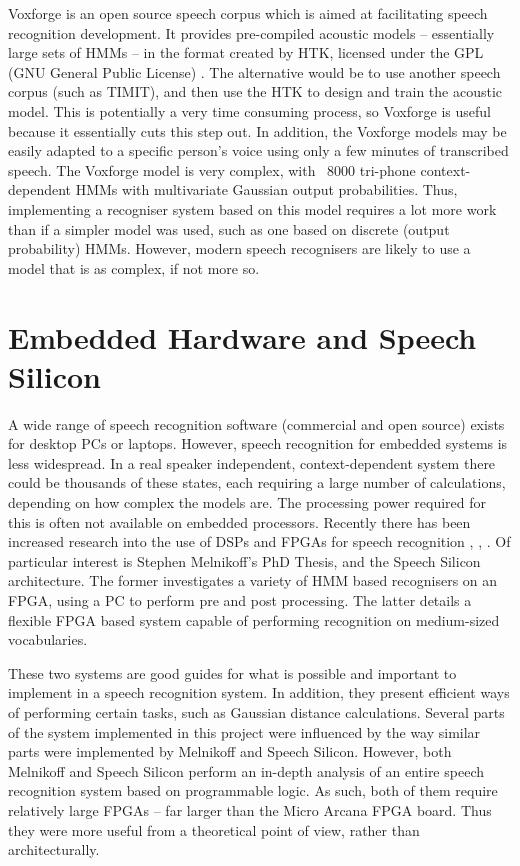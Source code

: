 	Voxforge is an open source speech corpus which is aimed at facilitating speech recognition development.  It provides pre-compiled acoustic models -- essentially large sets of HMMs -- in the format created by HTK, licensed under the GPL (GNU General Public License) \cite{voxforge}.  The alternative would be to use another speech corpus (such as TIMIT), and then use the HTK to design and train the acoustic model.  This is potentially a very time consuming process, so Voxforge is useful because it essentially cuts this step out.  In addition, the Voxforge models may be easily adapted to a specific person's voice using only a few minutes of transcribed speech.  The Voxforge model is very complex, with ~8000 tri-phone context-dependent HMMs with multivariate Gaussian output probabilities.  Thus, implementing a recogniser system based on this model requires a lot more work than if a simpler model was used, such as one based on discrete (output probability) HMMs.  However, modern speech recognisers are likely to use a model that is as complex, if not more so.


\section{Embedded Hardware and Speech Silicon} %
\label{sec:embedded_hardware}
	A wide range of speech recognition software (commercial and open source) exists for desktop PCs or laptops.  However, speech recognition for embedded systems is less widespread.  In a real speaker independent, context-dependent system there could be thousands of these states, each requiring a large number of calculations, depending on how complex the models are.  The processing power required for this is often not available on embedded processors.  Recently there has been increased research into the use of DSPs and FPGAs for speech recognition \cite{melnikoff2003speech}, \cite{schuster2006speech}, \cite{nedevschi2005hardware}.  Of particular interest is Stephen Melnikoff's PhD Thesis, and the Speech Silicon architecture.  The former investigates a variety of HMM based recognisers on an FPGA, using a PC to perform pre and post processing.  The latter details a flexible FPGA based system capable of performing recognition on medium-sized vocabularies.

	These two systems are good guides for what is possible and important to implement in a speech recognition system.  In addition, they present efficient ways of performing certain tasks, such as Gaussian distance calculations.  Several parts of the system implemented in this project were influenced by the way similar parts were implemented by Melnikoff and Speech Silicon.  However, both Melnikoff and Speech Silicon perform an in-depth analysis of an entire speech recognition system based on programmable logic.  As such, both of them require relatively large FPGAs -- far larger than the Micro Arcana FPGA board.  Thus they were more useful from a theoretical point of view, rather than architecturally.


